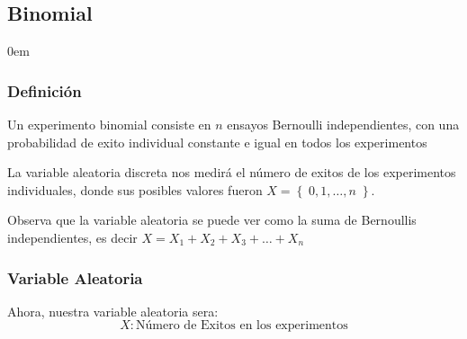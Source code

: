 \documentclass[12pt, fleqn]{report}                             %
\newenvironment{SmallIndentation}[1][0.75em]                    %
        {\begin{adjustwidth}{#1}{}\begin{footnotesize}}             %
        {\end{footnotesize}\end{adjustwidth}}                       %
\theoremstyle{break}                                            %
\newcommand{\Set}[1]            {\left\{ \; #1 \; \right\}}     %
\begin{document}
            \clearpage
            \subsection{Binomial}

                \begin{multicols}{2}
                \begin{SmallIndentation}[0em]

                    \subsubsection{Definición}

                        Un experimento binomial consiste en $n$ ensayos Bernoulli
                        independientes, con una probabilidad de exito individual constante e igual en 
                        todos los experimentos

                        La variable aleatoria discreta nos medirá el número de exitos de los experimentos individuales,
                        donde sus posibles valores fueron $X = \Set{0, 1, \dots, n}$.

                        Observa que la variable aleatoria se puede ver como la suma de Bernoullis independientes,
                        es decir $X = X_1 + X_2 + X_3 + \dots + X_n$

                        \subsubsection{Variable Aleatoria}

                            Ahora, nuestra variable aleatoria sera:
                            \begin{equation*}
                                X : \text{Número de Exitos en los experimentos}
                            \end{equation*}


\end{SmallIndentation}
\end{multicols}
\end{document}
